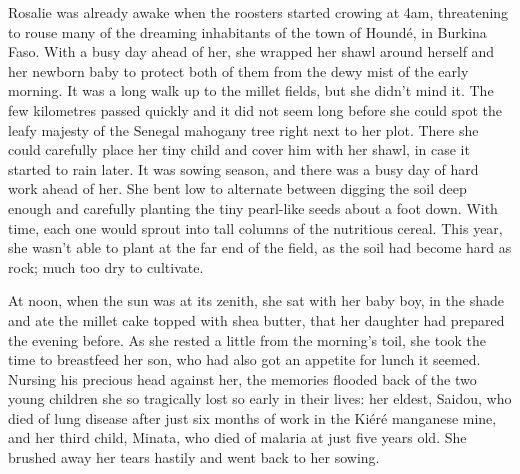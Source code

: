 \documentclass[a5paper,english,openany]{memoir}
\begin{document}
 Rosalie was already awake when the roosters %
 started crowing at 4am, threatening to rouse many of the dreaming inhabitants of the town %
 of Houndé, %
 in Burkina Faso. With a busy day ahead of her, she wrapped her shawl around herself and her newborn baby to protect both of them from the dewy mist of the early morning. It was a long walk up to the millet fields, but she didn't mind it. The few kilometres passed quickly and it did not seem long before she could spot the leafy majesty of the Senegal mahogany tree right next to her plot. There she could carefully place her tiny child and cover him with her shawl, in case it started to rain later. It was sowing season, and there was a busy day of hard work ahead of her. She bent low to alternate between digging the soil deep enough and carefully planting the tiny pearl-like seeds about a foot down. With time, each one would sprout into tall columns of the nutritious cereal. This year, she wasn't able to plant at the far end of the field, as the soil had become hard as rock; much too dry to cultivate.
 
 At noon, when the sun was at its zenith, she sat with her baby boy, in the shade and ate the millet cake topped with shea butter, that her daughter had prepared the evening before. As she rested a little from the morning's toil, she took the time to breastfeed her son, who had also got an appetite for lunch it seemed. Nursing his precious head against her, the memories flooded back of the two young children she so tragically lost so early in their lives: her eldest, Saidou, who died of lung disease after just six months of work in the Kiéré manganese mine, and her third child, Minata, who died of malaria at just five years old. She brushed away her tears hastily and went back to her sowing.
 
\end{document}
